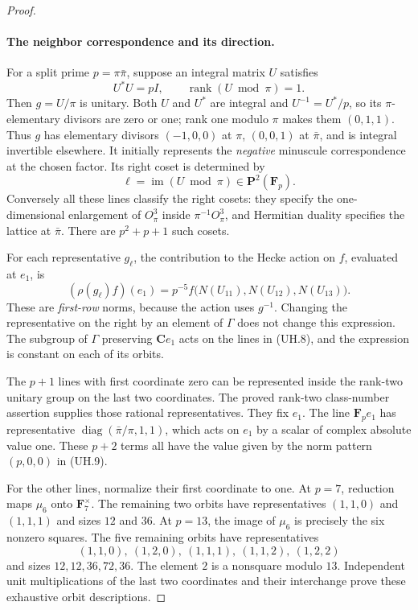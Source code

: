 \begin{proof}
\paragraph{The neighbor correspondence and its direction.}
For a split prime $p=\pi\bar\pi$, suppose an integral matrix $U$
satisfies
\[
 U^*U=pI,\qquad \operatorname{rank}(U\bmod\pi)=1.
 \tag{UH.7}
\]
Then $g=U/\pi$ is unitary.  Both $U$ and $U^*$ are integral and
$U^{-1}=U^*/p$, so its $\pi$-elementary divisors are zero or one;
rank one modulo $\pi$ makes them $(0,1,1)$.  Thus $g$ has elementary
divisors $(-1,0,0)$ at $\pi$, $(0,0,1)$ at $\bar\pi$, and is integral
invertible elsewhere.  It initially represents the \emph{negative}
minuscule correspondence at the chosen factor.  Its right coset is
determined by
\[
    \ell=\operatorname{im}(U\bmod\pi)\in\mathbf P^2(\mathbf F_p).
 \tag{UH.8}
\]
Conversely all these lines classify the right cosets: they specify
the one-dimensional enlargement of $O_\pi^3$ inside
$\pi^{-1}O_\pi^3$, and Hermitian duality specifies the lattice at
$\bar\pi$.  There are $p^2+p+1$ such cosets.

For each representative $g_\ell$, the contribution to the Hecke action
on $f$, evaluated at $e_1$, is
\[
 (\rho(g_\ell)f)(e_1)
   =p^{-5}f\bigl(N(U_{11}),N(U_{12}),N(U_{13})\bigr).
 \tag{UH.9}
\]
These are \emph{first-row} norms, because the action uses $g^{-1}$.
Changing the representative on the right by an element of $\Gamma$
does not change this expression.  The subgroup of $\Gamma$ preserving
$\mathbf Ce_1$ acts on the lines in (UH.8), and the expression is
constant on each of its orbits.

The $p+1$ lines with first coordinate zero can be represented inside
the rank-two unitary group on the last two coordinates.  The proved
rank-two class-number assertion supplies those rational representatives.
They fix $e_1$.  The line $\mathbf F_pe_1$ has representative
$\operatorname{diag}(\bar\pi/\pi,1,1)$, which acts on $e_1$ by a scalar
of complex absolute value one.  These $p+2$ terms all have the value
given by the norm pattern $(p,0,0)$ in (UH.9).

For the other lines, normalize their first coordinate to one.  At
$p=7$, reduction maps $\mu_6$ onto $\mathbf F_7^\times$.  The remaining
two orbits have representatives $(1,1,0)$ and $(1,1,1)$ and sizes
$12$ and $36$.  At $p=13$, the image of $\mu_6$ is precisely the six
nonzero squares.  The five remaining orbits have representatives
\[
 (1,1,0),\ (1,2,0),\ (1,1,1),\ (1,1,2),\ (1,2,2)
\]
and sizes $12,12,36,72,36$.  The element $2$ is a nonsquare modulo
$13$.  Independent unit multiplications of the last two coordinates
and their interchange prove these exhaustive orbit descriptions.


\end{proof}
